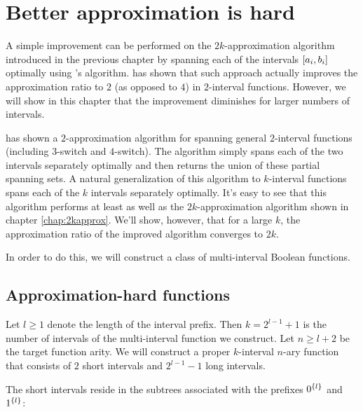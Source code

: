 \chapter{Better approximation is hard}

A simple improvement can be performed
on the $2k$-approximation algorithm introduced
in the previous chapter
by spanning each of the intervals
$[a_i, b_i]$ optimally
using \citeauthor{Schieber2005154}'s algorithm.
\citeauthor{Dubovsky2012} has shown that such approach
actually improves the approximation ratio to $2$
(as opposed to $4$)
in $2$-interval functions.
However,
we will show in this chapter that
the improvement diminishes for larger numbers of intervals.

\citeauthor{Dubovsky2012} has shown a $2$-approximation algorithm
for spanning general $2$-interval functions
(including $3$-switch and $4$-switch).\citep[p.~33]{Dubovsky2012}
The algorithm simply spans each of the two intervals
separately optimally and then returns the union
of these partial spanning sets.
A natural generalization of this algorithm to $k$-interval
functions spans each of the $k$ intervals separately
optimally.
It's easy to see that this algorithm performs
at least as well as the $2k$-approximation algorithm
shown in chapter \ref{chap:2kapprox}.
We'll show, however,
that for a large $k$,
the approximation ratio of the improved algorithm
converges to $2k$.

In order to do this,
we will construct a class of  multi-interval
Boolean functions.

\section{Approximation-hard functions}

Let $l \geq 1$
denote the length of the interval prefix.
Then $k = 2^{l-1} + 1$
is the number of intervals
of the multi-interval function we construct.
Let $n \geq l+2$ be the target function arity.
We will construct
a proper $k$-interval $n$-ary function
that consists of $2$ short intervals and $2^{l-1} - 1$
long intervals.

The short intervals reside in the subtrees associated
with the prefixes $0^{\{l\}}$ and $1^{\{l\}}$:

